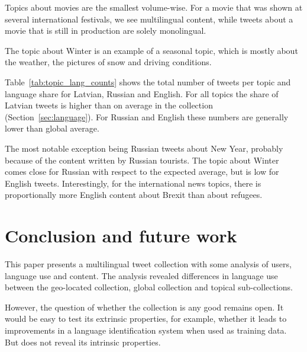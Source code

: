 \documentclass{IOS-Book-Article}
\begin{document}
Topics about movies are the smallest volume-wise. For a movie that was shown at several international festivals, we see multilingual content, while tweets about a movie that is still in production are solely monolingual.

The topic about Winter is an example of a seasonal topic, which is mostly about the weather, the pictures of snow and driving conditions.

Table~\ref{tab:topic_lang_counts} shows the total number of tweets per topic and language share for Latvian, Russian and English. For all topics the share of Latvian tweets is higher than on average in the collection (Section~\ref{sec:language}). For Russian and English these numbers are generally lower than global average.

The most notable exception being Russian tweets about New Year, probably because of the content written by Russian tourists. The topic about Winter comes close for Russian with respect to the expected average, but is low for English tweets. Interestingly, for the international news topics, there is proportionally more English content about Brexit than about refugees.



\section{Conclusion and future work}
\label{sec:conclusion}


This paper presents a multilingual tweet collection with some analysis of users, language use and content. The analysis revealed differences in language use between the geo-located collection, global collection and topical sub-collections.

However, the question of whether the collection is any good remains open. It would be easy to test its extrinsic properties, for example, whether it leads to improvements in a language identification system when used as training data. But does not reveal its intrinsic properties.






\end{document}
